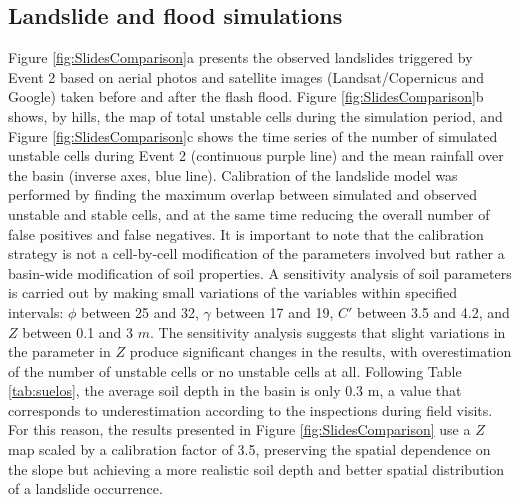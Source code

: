 \documentclass[hess, manuscript]{copernicus}
\begin{document}


\subsection{Landslide and flood simulations}

Figure \ref{fig:SlidesComparison}a presents the observed landslides triggered by Event 2  based on aerial photos and satellite images (Landsat/Copernicus and Google) taken before and after the flash flood.  Figure \ref{fig:SlidesComparison}b shows, by hills, the map of total unstable cells during the simulation period, and Figure \ref{fig:SlidesComparison}c shows the time series of the number of simulated unstable cells during Event 2 (continuous purple line) and the mean rainfall over the basin (inverse axes, blue line). Calibration of the landslide model was performed by finding the maximum overlap between simulated and observed unstable and stable cells, and at the same time reducing the overall number of false positives and false negatives. It is important to note that the calibration strategy is not a cell-by-cell modification of the parameters involved but rather a basin-wide modification of soil properties. A sensitivity analysis of soil parameters is carried out by making small variations of the variables within specified intervals: $\phi$ between 25 and 32, $\gamma$ between 17 and 19,  $C'$ between 3.5 and 4.2, and $Z$ between 0.1 and 3 $m$. The sensitivity analysis suggests that slight variations in the parameter in $Z$ produce significant changes in the results, with overestimation of the number of unstable cells or no unstable cells at all. Following Table \ref{tab:suelos}, the average soil depth in the basin is only 0.3 m, a value that corresponds to underestimation according to the inspections during field visits. For this reason, the results presented in Figure \ref{fig:SlidesComparison} use a  $Z$ map scaled by a calibration factor of 3.5, preserving the spatial dependence on the slope but achieving a more realistic soil depth and better spatial distribution of a landslide occurrence.\\ 
\end{document}

